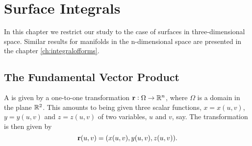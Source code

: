 
  \chapter{Surface Integrals}\label{chrSurf}%
   \label{chapter:surface}


 In this chapter we restrict our study to the case of surfaces in three-dimensional space. Similar results for manifolds in the n-dimensional space are presented in the chapter \ref{ch:integralofforms}.


\section{The Fundamental Vector Product}
\begin{df}

A   is given by a one-to-one
transformation $\mathbf{ r}:\Omega \to \mathbb{R}^n$, where $\Omega$ is a domain in the
plane $\mathbb{R}^2$.  This amounts to being given three scalar functions,
$x=x(u,v)$, $y=y(u,v)$ and $z=z(u,v)$  of two variables, $u$ and
$v$, say. The transformation is then given by
$$
\mathbf{ r}(u,v)= (x(u,v),y(u,v),z(u,v)).
$$
\end{df}


